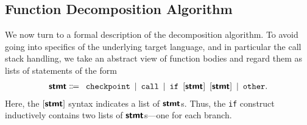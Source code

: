 \documentclass[runningheads]{llncs}
\newcommand{\stmt}{\textbf{\textsf{stmt}}}
\begin{document}
\subsection{Function Decomposition Algorithm}\label{sec:decalg}
We now turn to a formal description of the decomposition algorithm.
To avoid going into specifics of the underlying target language, and in particular the call stack handling, we take an abstract view of function bodies and regard them as lists of statements of the form
\begin{equation}\label{eq:stmts}
  \begin{aligned}
    \stmt \Coloneqq \enspace
    \texttt{checkpoint}
    \enspace | \enspace
    \texttt{call}
    \enspace | \enspace
    \texttt{if} \enspace
    [\stmt] \enspace
    [\stmt]
    \enspace | \enspace
    \texttt{other}.
  \end{aligned}
\end{equation}
Here, the $[\stmt]$ syntax indicates a list of $\stmt$s.
Thus, the \texttt{if} construct inductively contains two lists of $\stmt$s---one for each branch.
\end{document}
